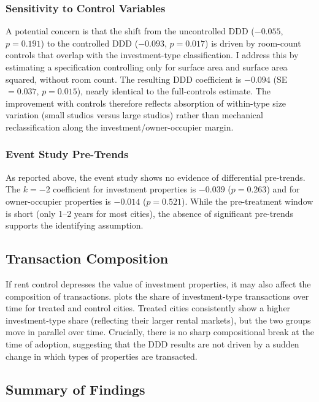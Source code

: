 \documentclass[12pt]{article}
\begin{document}
\subsubsection{Sensitivity to Control Variables}

A potential concern is that the shift from the uncontrolled DDD ($-0.055$, $p = 0.191$) to the controlled DDD ($-0.093$, $p = 0.017$) is driven by room-count controls that overlap with the investment-type classification. I address this by estimating a specification controlling only for surface area and surface area squared, without room count. The resulting DDD coefficient is $-0.094$ (SE $= 0.037$, $p = 0.015$), nearly identical to the full-controls estimate. The improvement with controls therefore reflects absorption of within-type size variation (small studios versus large studios) rather than mechanical reclassification along the investment/owner-occupier margin.

\subsubsection{Event Study Pre-Trends}

As reported above, the event study shows no evidence of differential pre-trends. The $k = -2$ coefficient for investment properties is $-0.039$ ($p = 0.263$) and for owner-occupier properties is $-0.014$ ($p = 0.521$). While the pre-treatment window is short (only 1--2 years for most cities), the absence of significant pre-trends supports the identifying assumption.

\subsection{Transaction Composition}

If rent control depresses the value of investment properties, it may also affect the composition of transactions.  plots the share of investment-type transactions over time for treated and control cities. Treated cities consistently show a higher investment-type share (reflecting their larger rental markets), but the two groups move in parallel over time. Crucially, there is no sharp compositional break at the time of adoption, suggesting that the DDD results are not driven by a sudden change in which types of properties are transacted.

\subsection{Summary of Findings}
\end{document}
